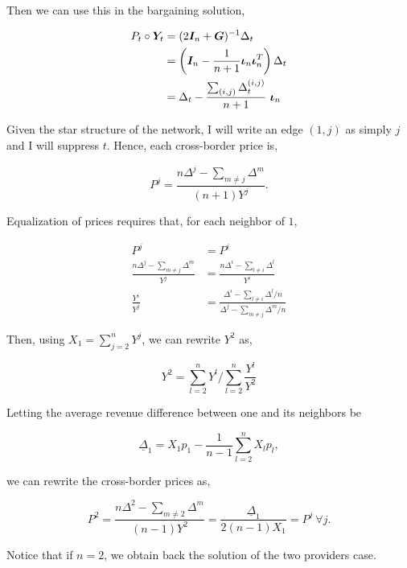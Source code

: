 Then we can use this in the bargaining solution,

\begin{equation*}
    \begin{split}
        P_t \circ \Y_t &= (2\I_n + \G)^{-1} \Delta_t \\
        &= \left( \I_n - \frac{1}{n + 1} \matr{\iota}_n \matr{\iota}_n^T \right) \Delta_t \\
        &= \Delta_t - \frac{\sum_{(i, j)} \Delta^{(i, j)}_t}{n+1} \ \matr{\iota}_n
    \end{split}
\end{equation*}

Given the star structure of the network, I will write an edge $(1, j)$ as simply $j$ and I will suppress $t$. Hence, each cross-border price is,

\begin{equation*}
    P^j = \frac{n\Delta^j - \sum_{m \neq j} \Delta^m }{(n + 1)Y^j}.
\end{equation*}

Equalization of prices requires that, for each neighbor of $1$,

\begin{equation*}
    \begin{split}
        P^j &= P^i \\
        \frac{n\Delta^j - \sum_{m \neq j} \Delta^m }{Y^j} &= \frac{n\Delta^i - \sum_{l \neq i} \Delta^l}{Y^i} \\
        \frac{Y^i}{Y^j} &= \frac{\Delta^i - \sum_{l \neq i} \Delta^l / n}{\Delta^j - \sum_{m \neq j} \Delta^m / n}
    \end{split}
\end{equation*}

Then, using $X_1 = \sum^n_{j = 2} Y^j$, we can rewrite $Y^2$ as,

\begin{equation*}
    Y^2 = \sum^n_{l = 2} Y^l \Big/ \sum^n_{l = 2} \frac{Y^l}{Y^2}
\end{equation*}

Letting the average revenue difference between one and its neighbors be

\begin{equation*}
    \underline{\Delta}_1 = X_1 p_1 - \frac{1}{n-1} \sum^n_{l = 2} X_l p_l,
\end{equation*}

we can rewrite the cross-border prices as,

\begin{equation*}
    P^2 = \frac{n \Delta^2 - \sum_{m \neq 2} \Delta^m}{(n-1) Y^2} = \frac{\underline{\Delta}_1}{2 (n-1) X_1} = P^j \ \forall j.
\end{equation*}

Notice that if $n = 2$, we obtain back the solution of the two providers case.